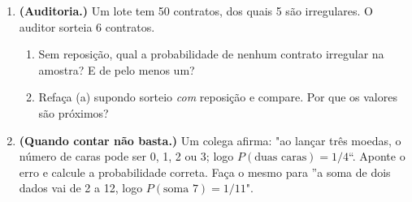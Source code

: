 \documentclass[11pt]{article}
\begin{document}
\begin{enumerate}[label=\textbf{A\arabic*.}, leftmargin=*]
\item \textbf{(Auditoria.)} Um lote tem 50 contratos, dos quais 5 são irregulares. O auditor sorteia 6 contratos.
\begin{enumerate}[label=(\alph*)]
  \item Sem reposição, qual a probabilidade de nenhum contrato irregular na amostra? E de pelo menos um?
  \item Refaça (a) supondo sorteio \emph{com} reposição e compare. Por que os valores são próximos?
\end{enumerate}

\item \textbf{(Quando contar não basta.)} Um colega afirma: "ao lançar três moedas, o número de caras pode ser 0, 1, 2 ou 3;
logo $P(\text{duas caras}) = 1/4$``. Aponte o erro e calcule a probabilidade correta. Faça o mesmo para ''a soma de dois dados
vai de 2 a 12, logo $P(\text{soma } 7) = 1/11$".

\end{enumerate}
\end{document}
